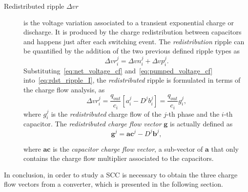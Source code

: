 \begin{description}
  \item[Redistributed ripple $\Delta vr$ ]is the voltage variation associated to a transient exponential charge or discharge. It is produced by the charge redistribution between capacitors and happens just after each switching event. The \emph{redistribution} ripple can be quantified by the addition of the two previous defined ripple types as
      \begin{equation}
        \Delta {vr}^j_i  = \Delta {vn}^j_i + \Delta {vp}^j_i .
      \label{eq:rdst_ripple_I}
      \end{equation}
      Substituting~\eqref{eq:net_voltage_cf} and~\eqref{eq:pumped_voltage_cf} into~\eqref{eq:rdst_ripple_I}, the \emph{redistributed} ripple is formulated in terms of the charge flow analysis, as
      \begin{equation}
        \Delta {vr}^j_i  = \frac{q_{out}}{c_i} \left[ a^j_i - D^j b^j_i \right] = \frac{q_{out}}{c_i} g^j_i,
      \label{eq:rdst_ripple_II}
      \end{equation}
      where $g^j_i$ is the \emph{redistributed} charge flow of the $j$-th phase and the $i$-th capacitor. The \emph{redistributed charge flow vector} $\mathbf{g}$ is actually defined as
      \begin{equation}
        \mathbf{g}^j   = \mathbf{ac}^j - D^j \mathbf{b}^j,
      \label{eq:rdst_chrg_flow}
      \end{equation}

      where $\mathbf{ac}$ is the \emph{capacitor charge flow vector}, a sub-vector of $\mathbf{a}$ that only contains the charge flow multiplier associated to the capacitors.
\end{description}
In conclusion, in order to study a SCC is necessary to obtain the three charge flow vectors from a converter, which is presented in the following section.


